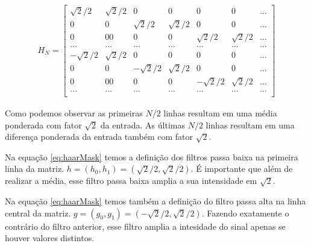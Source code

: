 \documentclass[
	article,			%
	11pt,				%
	oneside,			%
	a4paper,			%
	english,			%
	brazil,				%
	sumario=tradicional
	]{abntex2}
\begin{document}
\begin{align}
H_{N} = 
\begin{bmatrix} 
	\sqrt{2}/2 & \sqrt{2}/2 & 0 & 0 & 0 & 0 &...\\
	 0 & 0 & \sqrt{2}/2 & \sqrt{2}/2 & 0 & 0 &...\\
	 0 & 0 0 & 0 & 0 & \sqrt{2}/2 & \sqrt{2}/2 &... \\
         ...&...&...&...&...&...&...\\
	-\sqrt{2}/2 & \sqrt{2}/2 & 0 & 0 & 0 & 0 &...\\
	 0 & 0 & -\sqrt{2}/2 & \sqrt{2}/2 & 0 & 0 &...\\
	 0 & 0 0 & 0 & 0 & -\sqrt{2}/2 & \sqrt{2}/2 &... \\
         ...&...&...&...&...&...&...\\
\end{bmatrix}
\label{eq:haarMask}
\end{align}

Como podemos observar as primeiras $N/2$ linhas resultam em uma média ponderada
com fator $\sqrt{2}$ da entrada. As últimas $N/2$ linhas resultam em uma diferença
ponderada da entrada também com fator $\sqrt{2}$.

Na equação \ref{eq:haarMask} temos a definição dos filtros passa baixa na
primeira linha da matriz. $h=(h_0,h_1)=(\sqrt{2}/2,\sqrt{2}/2)$. É importante
que além de realizar a média, esse filtro passa baixa amplia a sua intensidade
em $\sqrt{2}$.

Na equação \ref{eq:haarMask} temos também a definição do filtro passa alta na
linha central da matriz. $g=(g_0,g_1)=(-\sqrt{2}/2,\sqrt{2}/2)$. Fazendo
exatamente o contrário do filtro anterior, esse filtro amplia a intesidade do
sinal apenas se houver valores distintos.
\end{document}
